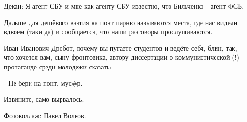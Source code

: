 Декан: Я агент СБУ и мне как агенту СБУ известно, что Бильченко - агент ФСБ.

Дальше для дешёвого взятия на понт парню называются места, где нас видели
вдвоем (таки да) и сообщается, что наши разговоры прослушиваются.

Иван Иванович Дробот, почему вы пугаете студентов и ведёте себя, блин, так, что
хочется вам, сыну фронтовика, автору диссертации о коммунистической (!)
пропаганде среди молодежи сказать:

- Не бери на понт, мус\#р.

Извините, само вырвалось.

Фотоколлаж: Павел Волков.


